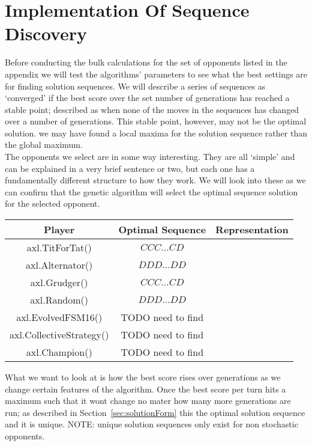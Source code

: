 \chapter{Implementation Of Sequence Discovery}\label{ch:implementation}
Before conducting the bulk calculations for the set of opponents listed in the appendix we will test the algorithms' parameters to see what the best settings are for finding solution sequences.
We will describe a series of sequences as `converged' if the best score over the set number of generations has reached a stable point;
described as when none of the moves in the sequences has changed over a number of generations.
This stable point, however, may not be the optimal solution.
we may have found a local maxima for the solution sequence rather than the global maximum. \\

The opponents we select are in some way interesting.
They are all `simple' and can be explained in a very brief sentence or two, but each one has a fundamentally different structure to how they work.
We will look into these as we can confirm that the genetic algorithm will select the optimal sequence solution for the selected opponent. \\

\begin{center}
    \begin{tabular}{ccc}
        \toprule
        Player & Optimal Sequence & Representation\\
        \midrule
        axl.TitForTat()&\(CCC\ldots CD\)&\\
        axl.Alternator()&\(DDD\ldots DD\)&\\
        axl.Grudger()&\(CCC\ldots CD\)&\\
        axl.Random()&\(DDD\ldots DD\)&\\
        axl.EvolvedFSM16()&TODO need to find&\\
        axl.CollectiveStrategy()&TODO need to find&\\
        axl.Champion()&TODO need to find&\\
        \bottomrule
    \end{tabular}
\end{center}

What we want to look at is how the best score rises over generations as we change certain features of the algorithm.
Once the best score per turn hits a maximum such that it wont change no mater how many more generations are run;
as described in Section~\ref{sec:solutionForm} this the optimal solution sequence and it is unique.
NOTE: unique solution sequences only exist for non stochastic opponents.\\

